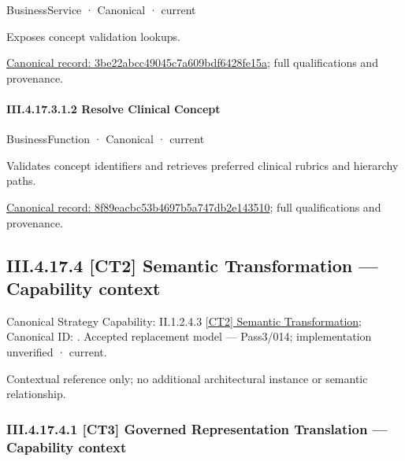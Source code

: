 \label{element:3be22abcc49045c7a609bdf6428fe15a}
{\small BusinessService · Canonical · current}\par

Exposes concept validation lookups.


{\footnotesize \href{../../../../../../../../continuum/business/business-service/3be22abcc49045c7a609bdf6428fe15a.md}{Canonical record: 3be22abcc49045c7a609bdf6428fe15a}; full qualifications and provenance.}\par
\paragraph*{III.4.17.3.1.2 Resolve Clinical Concept}
\label{navigation:III.4.17.3.1.2}

\label{element:8f89eacbc53b4697b5a747db2e143510}
{\small BusinessFunction · Canonical · current}\par

Validates concept identifiers and retrieves preferred clinical rubrics and hierarchy paths.


{\footnotesize \href{../../../../../../../../continuum/business/business-function/8f89eacbc53b4697b5a747db2e143510.md}{Canonical record: 8f89eacbc53b4697b5a747db2e143510}; full qualifications and provenance.}\par
\subsection*{III.4.17.4 [CT2] Semantic Transformation — Capability context}
\label{navigation:III.4.17.4}

{\small Canonical Strategy Capability: II.1.2.4.3 \hyperref[element:75c038039b55453184cbf1e787120136]{[CT2] Semantic Transformation}; Canonical ID: \texttt{}. Accepted replacement model — Pass3/014; implementation unverified · current.}\par
Contextual reference only; no additional architectural instance or semantic relationship.\par
\subsubsection*{III.4.17.4.1 [CT3] Governed Representation Translation — Capability context}
\label{navigation:III.4.17.4.1}

